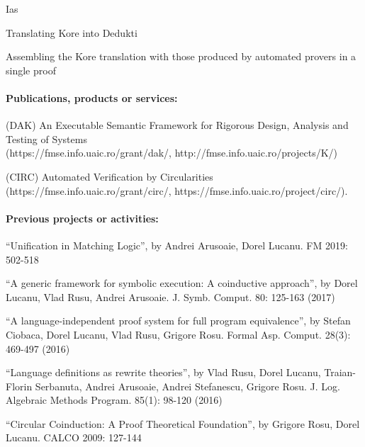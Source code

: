 \begin{sitedescription}{Ias}


\begin{compactitem}
\item Translating Kore into Dedukti
\item Assembling the Kore translation with those produced by automated provers in a single proof
\end{compactitem}

\paragraph*{Publications, products or services:}


\begin{compactitem}
\item  (DAK) An Executable Semantic Framework for Rigorous Design, Analysis and Testing of Systems\\
 (https://fmse.info.uaic.ro/grant/dak/, http://fmse.info.uaic.ro/projects/K/) 
\item (CIRC) Automated Verification by Circularities\\  (https://fmse.info.uaic.ro/grant/circ/, https://fmse.info.uaic.ro/project/circ/).
\end{compactitem}

\paragraph*{Previous projects or activities:}


\begin{compactitem}
\item ``Unification in Matching Logic'', by Andrei Arusoaie, Dorel Lucanu. FM 2019: 502-518
\item ``A generic framework for symbolic execution: A coinductive approach'', by Dorel Lucanu, Vlad Rusu, Andrei Arusoaie. J. Symb. Comput. 80: 125-163 (2017)
\item ``A language-independent proof system for full program equivalence'', by Stefan Ciobaca, Dorel Lucanu, Vlad Rusu, Grigore Rosu. Formal Asp. Comput. 28(3): 469-497 (2016)
\item ``Language definitions as rewrite theories'', by Vlad Rusu, Dorel Lucanu, Traian-Florin Serbanuta, Andrei Arusoaie, Andrei Stefanescu, Grigore Rosu. J. Log. Algebraic Methods Program. 85(1): 98-120 (2016)
\item ``Circular Coinduction: A Proof Theoretical Foundation'', by Grigore Rosu, Dorel Lucanu. CALCO 2009: 127-144
\end{compactitem}


\end{sitedescription}
